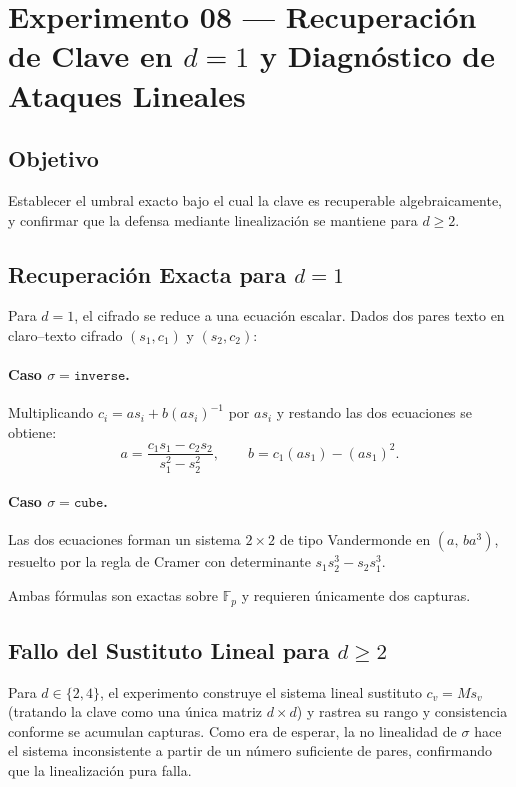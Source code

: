 \documentclass[12pt,a4paper]{article}
\theoremstyle{definition}
\newcommand{\Fp}{\mathbb{F}_p}
\begin{document}
\section{Experimento 08 --- Recuperación de Clave en $d=1$ y Diagnóstico de Ataques Lineales}

\subsection{Objetivo}

Establecer el umbral exacto bajo el cual la clave es recuperable
algebraicamente, y confirmar que la defensa mediante linealización
se mantiene para $d \geq 2$.

\subsection{Recuperación Exacta para $d = 1$}

Para $d = 1$, el cifrado se reduce a una ecuación escalar. Dados dos
pares texto en claro--texto cifrado $(s_1, c_1)$ y $(s_2, c_2)$:

\paragraph{Caso $\sigma = \texttt{inverse}$.}
Multiplicando $c_i = a s_i + b(as_i)^{-1}$ por $as_i$ y restando
las dos ecuaciones se obtiene:
\begin{equation}
  a = \frac{c_1 s_1 - c_2 s_2}{s_1^2 - s_2^2}, \qquad
  b = c_1(as_1) - (as_1)^2.
\end{equation}

\paragraph{Caso $\sigma = \texttt{cube}$.}
Las dos ecuaciones forman un sistema $2\times 2$ de tipo Vandermonde
en $(a,\, ba^3)$, resuelto por la regla de Cramer con determinante
$s_1 s_2^3 - s_2 s_1^3$.

Ambas fórmulas son exactas sobre $\Fp$ y requieren únicamente dos
capturas.

\subsection{Fallo del Sustituto Lineal para $d \geq 2$}

Para $d \in \{2, 4\}$, el experimento construye el sistema lineal
sustituto $c_v = M s_v$ (tratando la clave como una única matriz
$d\times d$) y rastrea su rango y consistencia conforme se acumulan
capturas. Como era de esperar, la no linealidad de $\sigma$ hace el
sistema inconsistente a partir de un número suficiente de pares,
confirmando que la linealización pura falla.
\end{document}
